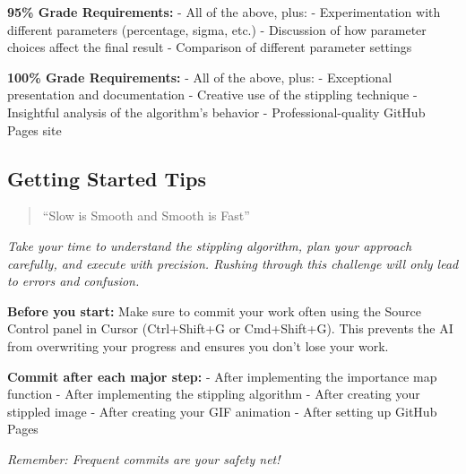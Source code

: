 \documentclass[
  letterpaper,
  DIV=11,
  numbers=noendperiod]{scrartcl}
\begin{document}
\textbf{95\% Grade Requirements:} - All of the above, plus: -
Experimentation with different parameters (percentage, sigma, etc.) -
Discussion of how parameter choices affect the final result - Comparison
of different parameter settings

\textbf{100\% Grade Requirements:} - All of the above, plus: -
Exceptional presentation and documentation - Creative use of the
stippling technique - Insightful analysis of the algorithm's behavior -
Professional-quality GitHub Pages site

\subsection{Getting Started Tips 🚀}\label{getting-started-tips}

\begin{tcolorbox}[enhanced jigsaw, arc=.35mm, colback=white, opacitybacktitle=0.6, rightrule=.15mm, leftrule=.75mm, title=\textcolor{quarto-callout-note-color}{\faInfo}\hspace{0.5em}{🎯 Navy SEALs Motto}, toptitle=1mm, toprule=.15mm, left=2mm, titlerule=0mm, coltitle=black, bottomtitle=1mm, opacityback=0, colframe=quarto-callout-note-color-frame, breakable, bottomrule=.15mm, colbacktitle=quarto-callout-note-color!10!white]

\begin{quote}
``Slow is Smooth and Smooth is Fast''
\end{quote}

\emph{Take your time to understand the stippling algorithm, plan your
approach carefully, and execute with precision. Rushing through this
challenge will only lead to errors and confusion.}

\end{tcolorbox}

\begin{tcolorbox}[enhanced jigsaw, arc=.35mm, colback=white, opacitybacktitle=0.6, rightrule=.15mm, leftrule=.75mm, title=\textcolor{quarto-callout-warning-color}{\faExclamationTriangle}\hspace{0.5em}{💾 Important: Save Your Work Frequently!}, toptitle=1mm, toprule=.15mm, left=2mm, titlerule=0mm, coltitle=black, bottomtitle=1mm, opacityback=0, colframe=quarto-callout-warning-color-frame, breakable, bottomrule=.15mm, colbacktitle=quarto-callout-warning-color!10!white]

\textbf{Before you start:} Make sure to commit your work often using the
Source Control panel in Cursor (Ctrl+Shift+G or Cmd+Shift+G). This
prevents the AI from overwriting your progress and ensures you don't
lose your work.

\textbf{Commit after each major step:} - After implementing the
importance map function - After implementing the stippling algorithm -
After creating your stippled image - After creating your GIF animation -
After setting up GitHub Pages

\emph{Remember: Frequent commits are your safety net!}

\end{tcolorbox}
\end{document}
